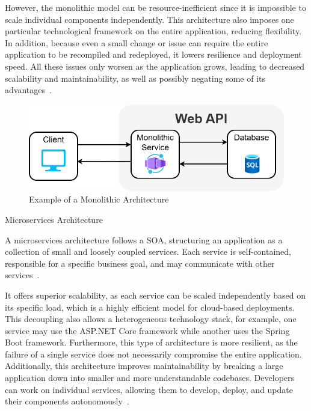 \documentclass[12pt,reqno, oneside]{amsbook}
\makeatletter
\def\subsection{\@startsection{subsection}{2}%
      \z@{.5\linespacing\@plus.7\linespacing}{.25\linespacing}%
      {\normalfont\bfseries\flushleft}}
\theoremstyle{definition}
\theoremstyle{definition}
\numberwithin{section}{chapter}
\numberwithin{table}{chapter}
\numberwithin{figure}{chapter}
\makeatother
\begin{document}
However, the monolithic model can be resource-inefficient since it is impossible to scale individual components independently. This architecture also imposes one particular technological framework on the entire application, reducing flexibility. In addition, because even a small change or issue can require the entire application to be recompiled and redeployed, it lowers resilience and deployment speed. All these issues only worsen as the application grows, leading to decreased scalability and maintainability, as well as possibly negating some of its advantages~\cite{Taibi2018, Adrio2023, Moysiadis2022, Figueira2024, Kenan2020, Villamizar2015}.

\FloatBarrier
\begin{figure}[H]
  \includegraphics[width=0.9\linewidth]{images/MonolithicArchitecture.png}
  \caption{\label{Figure:Monolithic_Architecture}Example of a Monolithic Architecture}
\end{figure}
\FloatBarrier

\pagebreak

\subsection{Microservices Architecture}
\label{Subsection:Microservices_Architecture}

A microservices architecture follows a \ac{SOA}, structuring an application as a collection of small and loosely coupled services. Each service is self-contained, responsible for a specific business goal, and may communicate with other services~\cite{Taibi2018, Adrio2023, Moysiadis2022, Khalfaoui2025, Figueira2024, Kenan2020}.

It offers superior scalability, as each service can be scaled independently based on its specific load, which is a highly efficient model for cloud-based deployments. This decoupling also allows a heterogeneous technology stack, for example, one service may use the ASP.NET Core framework while another uses the Spring Boot framework. Furthermore, this type of architecture is more resilient, as the failure of a single service does not necessarily compromise the entire application. Additionally, this architecture improves maintainability by breaking a large application down into smaller and more understandable codebases. Developers can work on individual services, allowing them to develop, deploy, and update their components autonomously~\cite{Taibi2018, Adrio2023, Moysiadis2022, Khalfaoui2025, Figueira2024, Kenan2020, Villamizar2015}.
\end{document}
